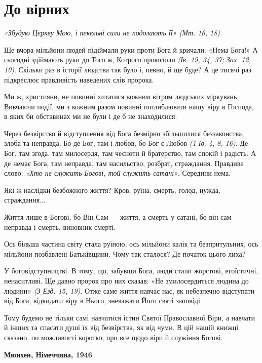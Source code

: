 \documentclass[main.tex]{subfiles}
\begin{document}
\chapter{До вірних}
\begin{FlushRight}
    \emph{{\color{red}«Збудую Церкву Мою, і пекельні сили не подолають її»} (Мт. 16, 18).}
\end{FlushRight}

 
Ще вчора мільйони людей підіймали руки проти Бога й кричали: «Нема Бога!» А сьогодні здіймають руки до Того ж, Котрого прокололи \emph{(Ів. 19, 34, 37; Зах. 12, 10)}. Скільки раз в історії людства так було і, певно, й ще буде? А це тисячі раз підкреслює правдивість наведених слів пророка.

Ми ж, християни, не повинні хитатися кожним вітром людських міркувань. Вивчаючи події, ми з кожним разом повинні поглиблювати нашу віру в Господа, в яких би обставинах ми не були і де б не знаходилися.

Через безвірство й відступлення від Бога безмірно збільшилися беззаконства, злоба та неправда. Бо де Бог, там і любов, бо Бог є Любов \emph{(1 Ів. 4, 8, 16)}. Де Бог, там згода, там милосердя, там чесноти й братерство, там спокій і радість. А де немає Бога, там неправда, там насильство, розбрат, страждання. Правдиве слово: \emph{«Хто не служить Богові, той служить сатані»}. Середини нема.

Які ж наслідки безбожного життя? Кров, руїна, смерть, голод, нужда, страждання...

Життя лише в Богові, бо Він Сам — життя, а смерть у сатані, бо він сам неправда і смерть, виновник смерті.

Ось більша частина світу стала руїною, ось мільйони калік та безпритульних, ось мільйони позбавлені Батьківщини. Чому так сталося? Де початок цього лиха?

У боговідступництві. В тому, що, забувши Бога, люди стали жорстокі, егоїстичні, ненаситливі. Ще давно пророк про них сказав: «Не змилосердиться людина до людини» \emph{(З Езд. 15, 19)}. Отже саме життя навчає нас, як небезпечно відступати від Бога, відкидати віру в Нього, зневажати Його святі заповіді.

Тому будемо не тільки самі навчатися істин Святої Православної Віри, а навчати й інших та спасати душі їх від безвірства, як від чуми.
В цій нашій книжці сказано, по можливості коротко, про все щодо віри й служіння Богові.

\begin{FlushRight}
    \textbf{Мюнхен, Німеччина, 1946}
\end{FlushRight}
\end{document}
